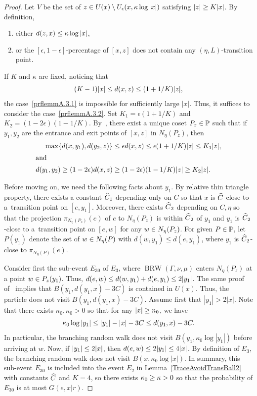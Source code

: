\documentclass[10pt]{amsart}
\theoremstyle{definition}\newtheorem{defi}[theo]{Definition}\newtheorem{rema}[theo]{Remark}\newtheorem{exam}[theo]{Example}\newtheorem{exem}[theo]{Example}\newtheorem{nota}[theo]{Notation}
\newcommand{\bbP}{\mathbb{P}}
\DeclareMathOperator{\BRW}{BRW}
\let\oldin\in
\renewcommand{\in}{\mathchoice{\oldin}{\oldin}{\,\oldin\,}{\,\oldin\,}}
\let\oldge\ge
\renewcommand{\ge}{\mathchoice{\oldge}{\oldge}{\,\oldge\,}{\,\oldge\,}}
\let\oldle\le
\renewcommand{\le}{\mathchoice{\oldle}{\oldle}{\,\oldle\,}{\,\oldle\,}}
\let\oldhat\hat
\renewcommand*{\hat}[1]{\mathchoice{\widehat{#1}}{\widehat{#1}}{\oldhat{#1}}{\oldhat{#1}}}
\begin{document}
\begin{proof}
Let $V$ be the set of $z\in U(x)\setminus U_{\epsilon}(x,\kappa \log |x|)$ satisfying $|z|\ge K|x|$. By definition,
\begin{enumerate}
\item\label{prflemmA.3.1} either $d(z, x)\le \kappa \log |x|$,
\item\label{prflemmA.3.2} or the $[\epsilon, 1-\epsilon]$-percentage of $[x,z]$ does not contain any $(\eta,L)$-transition point.
\end{enumerate}
If $K $ and $ \kappa$ are fixed, noticing that
\[
(K-1)|x|\le d(x,z)\le (1+1/K)|z|,
\]
the case~\eqref{prflemmA.3.1} is impossible for sufficiently large $|x|$. Thus, it suffices to consider the case~\eqref{prflemmA.3.2}. Set $K_1=\epsilon(1+1/K)$ and $K_2=(1-2\epsilon)(1-1/K)$. By~\cite[Lemma~6.1]{DWY}, there exist a unique coset $P_z\in \bbP$ such that if $y_1,y_2$ are the entrance and exit points of $[x,z]$ in $N_\eta(P_z)$, then
\begin{align}
\max\{d(x,y_1), d(y_2,z)\} &\le \epsilon d(x,z)\le \epsilon(1+1/K)|z|\le K_1|z|,\label{y1y2Def}
\\
\intertext{and}
d(y_1,y_2)\geq (1-2\epsilon)d(x,z) &\ge (1-2\epsilon)(1-1/K)|z|\ge K_2|z|.\label{y1y2EQ}
\end{align}


Before moving on, we need the following facts about $y_1$. By relative thin triangle property, there exists a constant $\hat C_1$ depending only on $C$ so that $x$ is $\hat C$-close to a~transition point on $[e,y_1]$. Moreover, there exists $\hat C_2$ depending on $C, \eta$ so that the projection $\pi_{N_{\eta}(P_z)}(e)$ of $e$ to $N_{\eta}(P_z)$ is within $\hat C_2$ of $y_1$ and $y_1$ is $\hat C_2$-close to a~transition point on $[e,w]$ for any $w\in N_\eta(P_z)$. For given $P\in \bbP$, let $P(y_1)$ denote the set of $w\in N_\eta(P)$ with $d(w,y_1)\leq d(e,y_1)$, where $y_1$ is $\hat C_2$-close to $\pi_{N_\eta(P)}(e)$.

Consider first the sub-event $E_{30}$ of $E_3$, where $\BRW(\Gamma,\nu,\mu)$ enters $N_\eta(P_z)$ at a point $w\in P_z(y_1)$. Thus, $d(e,w)\le d(w,y_1)+ d(e,y_1)\le 2|y_1|$.
The same proof of~\cite[Lemma~6.6]{DWY} implies that $B(y_1, d(y_1,x)-3C)$ is contained in $U(x)$. Thus, the particle does not visit $B(y_1, d(y_1,x)-3C)$. Assume first that $|y_1|>2|x|$. Note that there exists $n_0, \kappa_0>0$ so that for any $|x|\ge n_0$, we have
\[
\kappa_0 \log |y_1| \le |y_1|-|x|-3C\le d(y_1,x)-3C.
\]
In particular, the branching random walk does not visit $B(y_1,\kappa_0 \log |y_1|)$ before arriving at $w$. Now, if $|y_1|\le 2|x|$, then $d(e,w)\le 2|y_1|\le 4|x|$. By definition of $E_3$, the branching random walk does not visit $B(x,\kappa_0 \log |x|)$. In summary, this sub-event $E_{30}$ is included into the event $E_2$ in Lemma~\ref{TraceAvoidTransBall2} with constants $\hat C$ and $K=4$, so there exists $\kappa_0\ge \kappa>0$ so that the probability of $E_{30}$ is at most $G(e,x|r)$.


\end{proof}
\end{document}
